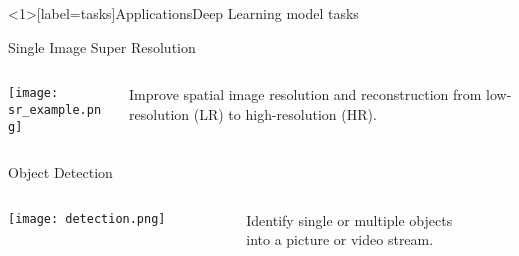 \documentclass[10pt, technote, oribibl, unicode]{beamer}
\begin{document}
\begin{frame}<1>[label=tasks]{Applications}{Deep Learning model tasks}



  \begin{exampleblock}{Single Image Super Resolution}
    \begin{columns}
      \begin{column}{0.7\textwidth}
        \hspace*{0.25cm}
        \texttt{[image: sr\_example.png]}
      \end{column}
      \begin{column}{0.3\textwidth}
        Improve spatial image resolution and reconstruction from low-resolution (LR) to high-resolution (HR).
      \end{column}
    \end{columns}
  \end{exampleblock}

  \begin{columns}
    \begin{column}{0.5\textwidth}

      \begin{block}{Object Detection}
        \begin{columns}
          \begin{column}{0.5\textwidth}
            \hspace*{0.25cm}
            \texttt{[image: detection.png]}
          \end{column}
          \begin{column}{0.5\textwidth}
            Identify single or multiple objects\\into a picture or video stream.
          \end{column}
        \end{columns}
      \end{block}



\end{column}
\end{columns}
\end{frame}
\end{document}
